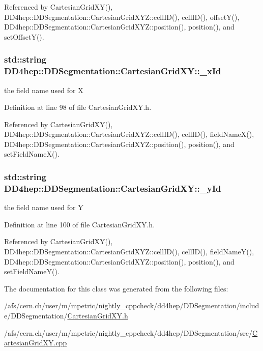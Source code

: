 Referenced by CartesianGridXY(), DD4hep::DDSegmentation::CartesianGridXYZ::cellID(), cellID(), offsetY(), DD4hep::DDSegmentation::CartesianGridXYZ::position(), position(), and setOffsetY().\hypertarget{class_d_d4hep_1_1_d_d_segmentation_1_1_cartesian_grid_x_y_a5d3ac6b5ea83c88420aba7ea9a05dff3}{
\subsubsection[{\_\-xId}]{\setlength{\rightskip}{0pt plus 5cm}std::string {\bf DD4hep::DDSegmentation::CartesianGridXY::\_\-xId}}}
\label{class_d_d4hep_1_1_d_d_segmentation_1_1_cartesian_grid_x_y_a5d3ac6b5ea83c88420aba7ea9a05dff3}


the field name used for X 

Definition at line 98 of file CartesianGridXY.h.

Referenced by CartesianGridXY(), DD4hep::DDSegmentation::CartesianGridXYZ::cellID(), cellID(), fieldNameX(), DD4hep::DDSegmentation::CartesianGridXYZ::position(), position(), and setFieldNameX().\hypertarget{class_d_d4hep_1_1_d_d_segmentation_1_1_cartesian_grid_x_y_af310e0e896cdddee02bf71b0cf6559a0}{
\subsubsection[{\_\-yId}]{\setlength{\rightskip}{0pt plus 5cm}std::string {\bf DD4hep::DDSegmentation::CartesianGridXY::\_\-yId}}}
\label{class_d_d4hep_1_1_d_d_segmentation_1_1_cartesian_grid_x_y_af310e0e896cdddee02bf71b0cf6559a0}


the field name used for Y 

Definition at line 100 of file CartesianGridXY.h.

Referenced by CartesianGridXY(), DD4hep::DDSegmentation::CartesianGridXYZ::cellID(), cellID(), fieldNameY(), DD4hep::DDSegmentation::CartesianGridXYZ::position(), position(), and setFieldNameY().

The documentation for this class was generated from the following files:\begin{DoxyCompactItemize}
\item 
/afs/cern.ch/user/m/mpetric/nightly\_\-cppcheck/dd4hep/DDSegmentation/include/DDSegmentation/\hyperlink{_d_d_segmentation_2include_2_d_d_segmentation_2_cartesian_grid_x_y_8h}{CartesianGridXY.h}\item 
/afs/cern.ch/user/m/mpetric/nightly\_\-cppcheck/dd4hep/DDSegmentation/src/\hyperlink{_d_d_segmentation_2src_2_cartesian_grid_x_y_8cpp}{CartesianGridXY.cpp}\end{DoxyCompactItemize}
